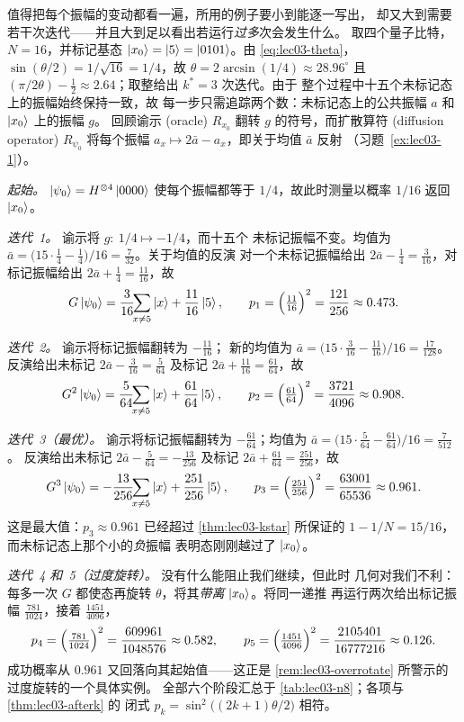 \begin{example}[一次完整演算的运行：$N=16$，标记项 $x_0=5$]
\label{exa:lec03-n8}
值得把每个振幅的变动都看一遍，所用的例子要小到能逐一写出，
却又大到需要若干次迭代——并且大到足以看出若运行\emph{过多}次会发生什么。
取四个量子比特，$N=16$，并标记基态
$\ket{x_0}=\ket{5}=\ket{0101}$。由 \eqref{eq:lec03-theta}，
$\sin(\theta/2)=1/\sqrt{16}=1/4$，故 $\theta=2\arcsin(1/4)\approx28.96^{\circ}$ 且
$(\pi/2\theta)-\tfrac12\approx2.64$；取整给出 $k^{\ast}=3$ 次迭代。由于
整个过程中十五个未标记态上的振幅始终保持一致，故
每一步只需追踪两个数：未标记态上的公共振幅 $a$ 和 $\ket{x_0}$ 上的振幅 $g$。
回顾谕示 (oracle) $R_{x_0}$ 翻转
$g$ 的符号，而扩散算符 (diffusion operator) $R_{\psi_0}$ 将每个振幅
$a_x\mapsto 2\bar a-a_x$，即关于均值 $\bar a$ 反射
（习题~\ref{ex:lec03-1}）。

\emph{起始。} $\ket{\psi_0}=H^{\otimes4}\ket{0000}$ 使每个振幅都等于
$1/4$，故此时测量以概率 $1/16$ 返回 $\ket{x_0}$。

\emph{迭代~1。} 谕示将 $g\colon\ 1/4\mapsto-1/4$，而十五个
未标记振幅不变。均值为
$\bar a=\bigl(15\cdot\tfrac14-\tfrac14\bigr)/16=\tfrac{7}{32}$。关于均值的反演
对一个未标记振幅给出 $2\bar a-\tfrac14=\tfrac{3}{16}$，对
标记振幅给出 $2\bar a+\tfrac14=\tfrac{11}{16}$，故
\[
  G\ket{\psi_0}=\frac{3}{16}\!\!\sum_{x\neq 5}\ket{x}+\frac{11}{16}\ket{5},
  \qquad
  p_1=\Bigl(\tfrac{11}{16}\Bigr)^{2}=\frac{121}{256}\approx0.473.
\]

\emph{迭代~2。} 谕示将标记振幅翻转为 $-\tfrac{11}{16}$；
新的均值为 $\bar a=\bigl(15\cdot\tfrac{3}{16}-\tfrac{11}{16}\bigr)/16
=\tfrac{17}{128}$。反演给出未标记 $2\bar a-\tfrac{3}{16}=\tfrac{5}{64}$
及标记 $2\bar a+\tfrac{11}{16}=\tfrac{61}{64}$，故
\[
  G^{2}\ket{\psi_0}=\frac{5}{64}\!\!\sum_{x\neq5}\ket{x}+\frac{61}{64}\ket{5},
  \qquad
  p_2=\Bigl(\tfrac{61}{64}\Bigr)^{2}=\frac{3721}{4096}\approx0.908.
\]

\emph{迭代~3（最优）。} 谕示将标记振幅翻转为
$-\tfrac{61}{64}$；均值为
$\bar a=\bigl(15\cdot\tfrac{5}{64}-\tfrac{61}{64}\bigr)/16=\tfrac{7}{512}$。
反演给出未标记 $2\bar a-\tfrac{5}{64}=-\tfrac{13}{256}$ 及标记
$2\bar a+\tfrac{61}{64}=\tfrac{251}{256}$，故
\[
  G^{3}\ket{\psi_0}=-\frac{13}{256}\!\!\sum_{x\neq5}\ket{x}+\frac{251}{256}\ket{5},
  \qquad
  p_3=\Bigl(\tfrac{251}{256}\Bigr)^{2}=\frac{63001}{65536}\approx0.961.
\]
这是最大值：$p_3\approx0.961$ 已经超过 \cref{thm:lec03-kstar} 所保证的
$1-1/N=15/16$，而未标记态上那个小的\emph{负}振幅
表明态刚刚越过了 $\ket{x_0}$。

\emph{迭代~4 和~5（过度旋转）。} 没有什么能阻止我们继续，但此时
几何对我们不利：每多一次 $G$ 都使态再旋转
$\theta$，将其\emph{带离} $\ket{x_0}$。将同一递推
再运行两次给出标记振幅 $\tfrac{781}{1024}$，接着 $\tfrac{1451}{4096}$，
\[
  p_4=\Bigl(\tfrac{781}{1024}\Bigr)^{2}=\frac{609961}{1048576}\approx0.582,
  \qquad
  p_5=\Bigl(\tfrac{1451}{4096}\Bigr)^{2}=\frac{2105401}{16777216}\approx0.126.
\]
成功概率从 $0.961$ 又回落向其起始值——这正是
\cref{rem:lec03-overrotate} 所警示的过度旋转的一个具体实例。
全部六个阶段汇总于 \cref{tab:lec03-n8}；各项与 \cref{thm:lec03-afterk} 的
闭式 $p_k=\sin^{2}\bigl((2k+1)\theta/2\bigr)$ 相符。
\end{example}

